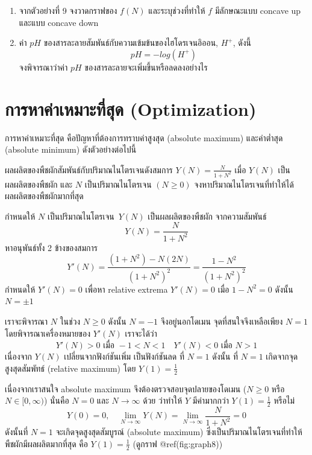 \documentclass[
]{book}
\begin{document}
\begin{enumerate}
\def\labelenumi{\arabic{enumi}.}
\item
  จากตัวอย่างที่ 9 จงวาดกราฟของ \(f(N)\) และระบุช่วงที่ทำให้ \(f\) มีลักษณะแบบ
  concave up และแบบ concave down
\item
  ค่า \(pH\) ของสารละลายสัมพันธ์กับความเข้มข้นของไฮโดรเจนอิออน, \(H^+\), ดังนี้
  \[pH=-log(H^+)\] จงพิจารณาว่าค่า \(pH\) ของสารละลายจะเพิ่มขึ้นหรือลดลงอย่างไร
\end{enumerate}

\section{การหาค่าเหมาะที่สุด
(Optimization)}\label{uxe01uxe32uxe23uxe2buxe32uxe04uxe32uxe40uxe2buxe21uxe32uxe30uxe17uxe2auxe14-optimization}

การหาค่าเหมาะที่สุด คือปัญหาที่ต้องการทราบค่าสูงสุด (absolute maximum) และค่าต่ำสุด
(absolute minimum) ดังตัวอย่างต่อไปนี้

ผลผลิตของพืชผักสัมพันธ์กับปริมาณไนโตรเจนดังสมการ
\(\displaystyle Y(N)= \frac{N}{1+N^2}\) เมื่อ \(Y(N)\) เป็นผลผลิตของพืชผัก และ
\(N\) เป็นปริมาณไนโตรเจน \((N \ge 0)\)
จงหาปริมาณไนโตรเจนที่ทำให้ได้ผลผลิตของพืชผักมากที่สุด

กำหนดให้ \(N\) เป็นปริมาณไนโตรเจน~\(Y(N)\) เป็นผลผลิตของพืชผัก จากความสัมพันธ์
\[Y(N)= \frac{N}{1+N^2}\] หาอนุพันธ์ทั้ง 2 ข้างของสมการ
\[Y'(N)= \frac{(1+N^2)-N(2N)}{(1+N^2)^2}= \frac{1-N^2}{(1+N^2)^2}\]
กำหนดให้ \(Y'(N)=0\) เพื่อหา relative extrema \(Y'(N)=0\) เมื่อ \(1-N^2=0\)
ดังนั้น \(N= \pm 1\)

เราจะพิจารณา \(N\) ในช่วง \(N \ge 0\) ดังนั้น \(N=-1\) จึงอยู่นอกโดเมน
จุดที่สนใจจึงเหลือเพียง \(N=1\) โดยพิจารณาเครื่องหมายของ \(Y'(N)\) เราจะได้ว่า
\[Y'(N) > 0 \text{ เมื่อ }  -1< N <1  \quad  Y'(N) < 0 \text{ เมื่อ } N > 1\]
เนื่องจาก \(Y(N)\) เปลี่ยนจากฟังก์ชันเพิ่ม เป็นฟังก์ชันลด ที่ \(N=1\) ดังนั้น ที่ \(N=1\)
เกิดจากจุดสูงสุดสัมพัทธ์ (relative maximum) โดย \(Y(1)= \frac{1}{2}\)

เนื่องจากเราสนใจ absolute maximum จึงต้องตรวจสอบจุดปลายของโดเมน (\(N \ge 0\)
หรือ \(N \in [0,\infty)\)) นั่นคือ \(N=0\) และ \(N \rightarrow \infty\) ด้วย
ว่าทำให้ \(Y\) มีค่ามากกว่า \(Y(1)= \frac{1}{2}\) หรือไม่
\[Y(0)=0,   \quad  \lim_{N \rightarrow \infty} Y(N) =\lim_{N \rightarrow \infty} \frac{N}{1+N^2} = 0\]
ดังนั้นที่ \(N=1\) จะเกิดจุดสูงสุดสัมบูรณ์ (absolute maximum)
ซึ่งเป็นปริมาณไนโตรเจนที่ทำให้พืชผักมีผลผลิตมากที่สุด คือ \(Y(1)= \frac{1}{2}\) (ดูกราฟ
@ref(fig:graph8))
\end{document}
